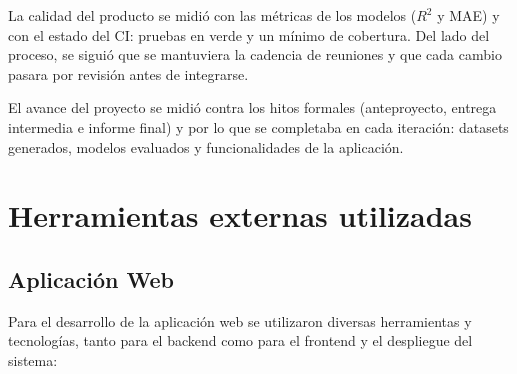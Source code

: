 \documentclass[12pt,a4paper]{article}
\begin{document}
La calidad del producto se midió con las métricas de los modelos ($R^2$ y MAE) y con el
estado del CI: pruebas en verde y un mínimo de cobertura. Del lado del proceso, se siguió
que se mantuviera la cadencia de reuniones y que cada cambio pasara por revisión antes de
integrarse.

El avance del proyecto se midió contra los hitos formales (anteproyecto, entrega
intermedia e informe final) y por lo que se completaba en cada iteración: datasets
generados, modelos evaluados y funcionalidades de la aplicación.

\newpage
\section{Herramientas externas utilizadas}

\subsection*{Aplicación Web}

Para el desarrollo de la aplicación web se utilizaron diversas herramientas y tecnologías, tanto para el backend como 
para el frontend y el despliegue del sistema:
\end{document}
